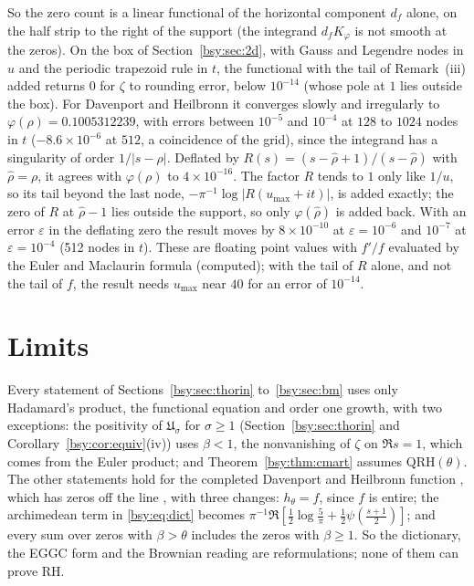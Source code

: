So the zero count is a linear functional of the horizontal component $d_f$ alone, on the half strip to the right of the support (the integrand $d_fK_\varphi$ is not smooth at the zeros). On the box of Section~\ref{bsy:sec:2d}, with Gauss and Legendre nodes in $u$ and the periodic trapezoid rule in $t$, the functional with the tail of Remark~(iii) added returns $0$ for $\zeta$ to rounding error, below $10^{-14}$ (whose pole at $1$ lies outside the box). For Davenport and Heilbronn it converges slowly and irregularly to $\varphi(\rho)=0.1005312239$, with errors between $10^{-5}$ and $10^{-4}$ at $128$ to $1024$ nodes in $t$ ($-8.6\times10^{-6}$ at $512$, a coincidence of the grid), since the integrand has a singularity of order $1/|s-\rho|$. Deflated by $R(s)=(s-\hat\rho+1)/(s-\hat\rho)$ with $\hat\rho=\rho$, it agrees with $\varphi(\rho)$ to $4\times10^{-16}$. The factor $R$ tends to $1$ only like $1/u$, so its tail beyond the last node, $-\pi^{-1}\log|R(u_{\max}+it)|$, is added exactly; the zero of $R$ at $\hat\rho-1$ lies outside the support, so only $\varphi(\hat\rho)$ is added back. With an error $\varepsilon$ in the deflating zero the result moves by $8\times10^{-10}$ at $\varepsilon=10^{-6}$ and $10^{-7}$ at $\varepsilon=10^{-4}$ (512 nodes in $t$). These are floating point values with $f'/f$ evaluated by the Euler and Maclaurin formula (computed); with the tail of $R$ alone, and not the tail of $f$, the result needs $u_{\max}$ near $40$ for an error of $10^{-14}$.

\section{Limits}\label{bsy:sec:limits}

Every statement of Sections~\ref{bsy:sec:thorin} to~\ref{bsy:sec:bm} uses only Hadamard's product, the functional equation and order one growth, with two exceptions: the positivity of $\mathfrak U_\sigma$ for $\sigma\ge1$ (Section~\ref{bsy:sec:thorin} and Corollary~\ref{bsy:cor:equiv}(iv)) uses $\beta<1$, the nonvanishing of $\zeta$ on $\Re s=1$, which comes from the Euler product; and Theorem~\ref{bsy:thm:cmart} assumes $\mathrm{QRH}(\theta)$. The other statements hold for the completed Davenport and Heilbronn function \cite{DH36}, which has zeros off the line \cite{Spira94,BSO07}, with three changes: $h_\theta=f$, since $f$ is entire; the archimedean term in \eqref{bsy:eq:dict} becomes $\pi^{-1}\Re[\frac12\log\frac5\pi+\frac12\psi(\frac{s+1}2)]$; and every sum over zeros with $\beta>\theta$ includes the zeros with $\beta\ge1$. So the dictionary, the EGGC form and the Brownian reading are reformulations; none of them can prove RH.


